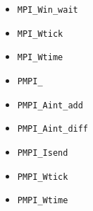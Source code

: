 \begin{multicols}{3}
\begin{itemize}
\item \texttt{MPI_Win_wait}~\pageref{def:MPI_Win_wait}
\item \texttt{MPI_Wtick}~\pageref{def:MPI_Wtick}
\item \texttt{MPI_Wtime}~\pageref{def:MPI_Wtime}
\item \texttt{PMPI_}~\pageref{def:PMPI_}
\item \texttt{PMPI_Aint_add}~\pageref{def:PMPI_Aint_add}
\item \texttt{PMPI_Aint_diff}~\pageref{def:PMPI_Aint_diff}
\item \texttt{PMPI_Isend}~\pageref{def:PMPI_Isend}
\item \texttt{PMPI_Wtick}~\pageref{def:PMPI_Wtick}
\item \texttt{PMPI_Wtime}~\pageref{def:PMPI_Wtime}
\end{itemize}
\end{multicols}
